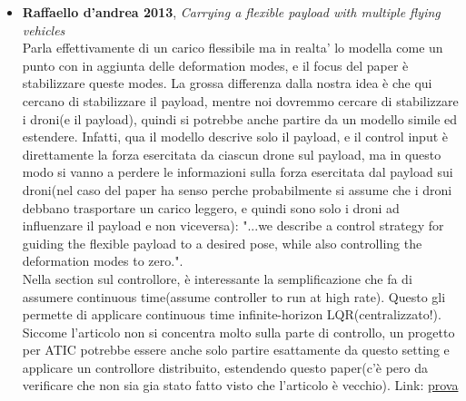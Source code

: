 \documentclass[11pt]{article}
\begin{document}
\begin{itemize}
     \item \textbf{Raffaello d'andrea 2013}, \emph{Carrying a flexible payload with multiple flying vehicles} \\
  Parla effettivamente di un carico flessibile ma in realta' lo modella come un punto con in aggiunta delle deformation modes, e il focus del paper è stabilizzare queste modes. La grossa differenza dalla nostra idea è che qui cercano di stabilizzare il payload, mentre noi dovremmo cercare di stabilizzare i droni(e il payload), quindi si potrebbe anche partire da un modello simile ed estendere. Infatti, qua il modello descrive solo il payload, e il control input è direttamente la forza esercitata da ciascun drone sul payload, ma in questo modo si vanno a perdere le informazioni sulla forza esercitata dal payload sui droni(nel caso del paper ha senso perche probabilmente si assume che i droni debbano trasportare un carico leggero, e quindi sono solo i droni ad influenzare il payload e non viceversa): "...we describe a control strategy for guiding the flexible payload to a desired pose, while also controlling the deformation modes to zero.".  \\
  Nella section sul controllore, è interessante la semplificazione che fa di assumere continuous time(assume controller to run at high rate). Questo gli permette di applicare continuous time infinite-horizon LQR(centralizzato!). Siccome l'articolo non si concentra molto sulla parte di controllo, un progetto per ATIC potrebbe essere anche solo partire esattamente da questo setting e applicare un controllore distribuito, estendendo questo paper(c'è pero da verificare che non sia gia stato fatto visto che l'articolo è vecchio).
    Link: \href{https://www.researchgate.net/publication/261353164_Carrying_a_flexible_payload_with_multiple_flying_vehicles}{prova}

   \end{itemize}
   
\end{document}
